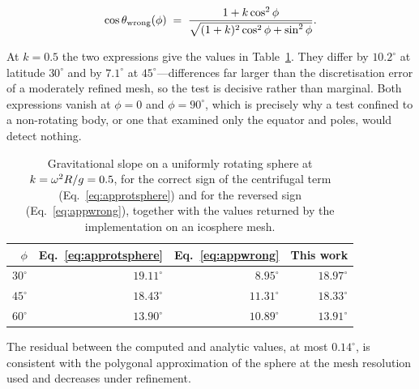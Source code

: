 \begin{equation}
\cos\theta_{\text{wrong}}(\phi) \;=\;
\frac{1+k\cos^{2}\phi}
     {\sqrt{(1+k)^{2}\cos^{2}\phi + \sin^{2}\phi}}.
\label{eq:appwrong}
\end{equation}

At $k = 0.5$ the two expressions give the values in
Table~\ref{tab:approtsphere}. They differ by $10.2^{\circ}$ at latitude
$30^{\circ}$ and by $7.1^{\circ}$ at $45^{\circ}$---differences far larger than
the discretisation error of a moderately refined mesh, so the test is decisive
rather than marginal. Both expressions vanish at $\phi = 0$ and
$\phi = 90^{\circ}$, which is precisely why a test confined to a non-rotating
body, or one that examined only the equator and poles, would detect nothing.

\begin{table}[t]
\centering
\small
\caption{Gravitational slope on a uniformly rotating sphere at
$k = \omega^{2}R/g = 0.5$, for the correct sign of the centrifugal term
(Eq.~\ref{eq:approtsphere}) and for the reversed sign
(Eq.~\ref{eq:appwrong}), together with the values returned by the
implementation on an icosphere mesh.}
\label{tab:approtsphere}
\begin{tabular}{rrrr}
\toprule
$\phi$ & Eq.~\eqref{eq:approtsphere} & Eq.~\eqref{eq:appwrong} & This work \\
\midrule
$30^{\circ}$ & $19.11^{\circ}$ & $8.95^{\circ}$  & $18.97^{\circ}$ \\
$45^{\circ}$ & $18.43^{\circ}$ & $11.31^{\circ}$ & $18.33^{\circ}$ \\
$60^{\circ}$ & $13.90^{\circ}$ & $10.89^{\circ}$ & $13.91^{\circ}$ \\
\bottomrule
\end{tabular}
\end{table}

The residual between the computed and analytic values, at most $0.14^{\circ}$,
is consistent with the polygonal approximation of the sphere at the mesh
resolution used and decreases under refinement.
